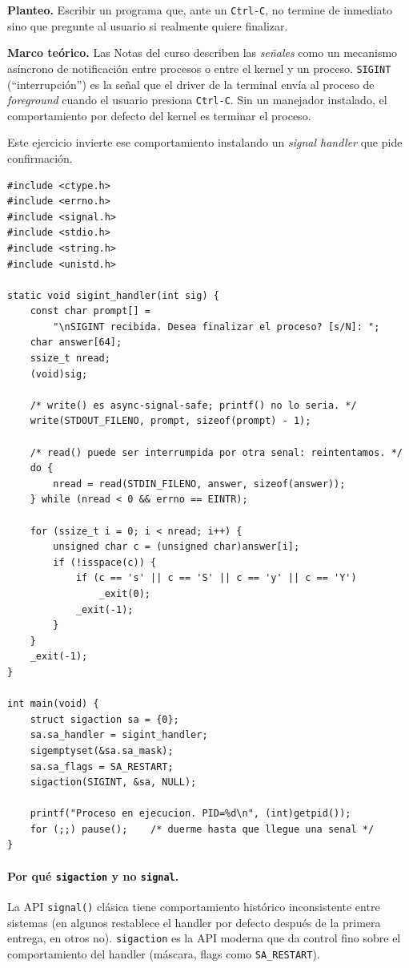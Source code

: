 \documentclass[11pt,a4paper]{article}
\begin{document}
\textbf{Planteo.} Escribir un programa que, ante un \texttt{Ctrl-C},
no termine de inmediato sino que pregunte al usuario si realmente
quiere finalizar.

\textbf{Marco teórico.} Las Notas del curso describen las
\emph{señales} como un mecanismo asíncrono de notificación entre
procesos o entre el kernel y un proceso. \texttt{SIGINT}
(``interrupción'') es la señal que el driver de la terminal envía al
proceso de \emph{foreground} cuando el usuario presiona
\texttt{Ctrl-C}. Sin un manejador instalado, el comportamiento por
defecto del kernel es terminar el proceso.

Este ejercicio invierte ese comportamiento instalando un \emph{signal
handler} que pide confirmación.

\begin{lstlisting}[style=cstyle]
#include <ctype.h>
#include <errno.h>
#include <signal.h>
#include <stdio.h>
#include <string.h>
#include <unistd.h>

static void sigint_handler(int sig) {
    const char prompt[] =
        "\nSIGINT recibida. Desea finalizar el proceso? [s/N]: ";
    char answer[64];
    ssize_t nread;
    (void)sig;

    /* write() es async-signal-safe; printf() no lo seria. */
    write(STDOUT_FILENO, prompt, sizeof(prompt) - 1);

    /* read() puede ser interrumpida por otra senal: reintentamos. */
    do {
        nread = read(STDIN_FILENO, answer, sizeof(answer));
    } while (nread < 0 && errno == EINTR);

    for (ssize_t i = 0; i < nread; i++) {
        unsigned char c = (unsigned char)answer[i];
        if (!isspace(c)) {
            if (c == 's' || c == 'S' || c == 'y' || c == 'Y')
                _exit(0);
            _exit(-1);
        }
    }
    _exit(-1);
}

int main(void) {
    struct sigaction sa = {0};
    sa.sa_handler = sigint_handler;
    sigemptyset(&sa.sa_mask);
    sa.sa_flags = SA_RESTART;
    sigaction(SIGINT, &sa, NULL);

    printf("Proceso en ejecucion. PID=%d\n", (int)getpid());
    for (;;) pause();    /* duerme hasta que llegue una senal */
}
\end{lstlisting}

\paragraph{Por qué \texttt{sigaction} y no \texttt{signal}.}
La API \texttt{signal()} clásica tiene comportamiento histórico
inconsistente entre sistemas (en algunos restablece el handler por
defecto después de la primera entrega, en otros no). \texttt{sigaction}
es la API moderna que da control fino sobre el comportamiento del
handler (máscara, flags como \texttt{SA\_RESTART}).
\end{document}
